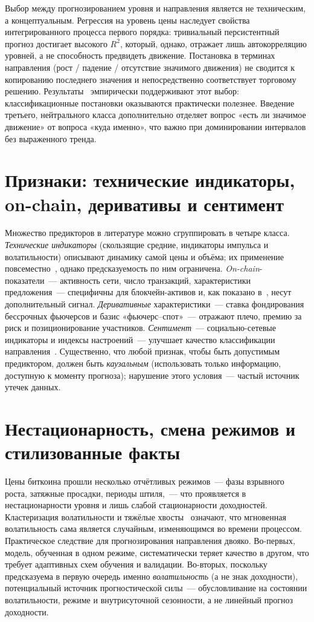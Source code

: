 \documentclass[12pt,a4paper]{report}
\begin{document}
Выбор между прогнозированием уровня и направления является не техническим, а
концептуальным. Регрессия на уровень цены наследует свойства интегрированного
процесса первого порядка: тривиальный персистентный прогноз достигает высокого
$R^2$, который, однако, отражает лишь автокорреляцию уровней, а не способность
предвидеть движение. Постановка в терминах направления (рост / падение / отсутствие
значимого движения) не сводится к копированию последнего значения и непосредственно
соответствует торговому решению. Результаты~\cite{ji2019, ortu2022} эмпирически
поддерживают этот выбор: классификационные постановки оказываются практически
полезнее. Введение третьего, нейтрального класса дополнительно отделяет вопрос
«есть ли значимое движение» от вопроса «куда именно», что важно при доминировании
интервалов без выраженного тренда.

\section{Признаки: технические индикаторы, on-chain, деривативы и сентимент}

Множество предикторов в литературе можно сгруппировать в четыре класса.
\emph{Технические индикаторы} (скользящие средние, индикаторы импульса и
волатильности) описывают динамику самой цены и объёма; их применение
повсеместно~\cite{ji2019, livieris2020, labbaf2024}, однако предсказуемость по
ним ограничена. \emph{On-chain}-показатели~--- активность сети, число транзакций,
характеристики предложения~--- специфичны для блокчейн-активов и, как показано
в~\cite{kim2022}, несут дополнительный сигнал. \emph{Деривативные}
характеристики~--- ставка фондирования бессрочных фьючерсов и базис
«фьючерс--спот»~--- отражают плечо, премию за риск и позиционирование участников.
\emph{Сентимент}~--- социально-сетевые индикаторы и индексы настроений~--- улучшает
качество классификации направления~\cite{ortu2022, dashtaki2025}. Существенно, что
любой признак, чтобы быть допустимым предиктором, должен быть \emph{каузальным}
(использовать только информацию, доступную к моменту прогноза); нарушение этого
условия~--- частый источник утечек данных.

\section{Нестационарность, смена режимов и стилизованные факты}

Цены биткоина прошли несколько отчётливых режимов~--- фазы взрывного роста,
затяжные просадки, периоды штиля,~--- что проявляется в нестационарности уровня и
лишь слабой стационарности доходностей. Кластеризация волатильности и тяжёлые
хвосты~\cite{mandelbrot1963} означают, что мгновенная волатильность сама является
случайным, изменяющимся во времени процессом. Практическое следствие для
прогнозирования направления двояко. Во-первых, модель, обученная в одном режиме,
систематически теряет качество в другом, что требует адаптивных схем обучения и
валидации. Во-вторых, поскольку предсказуема в первую очередь именно
\emph{волатильность} (а не знак доходности), потенциальный источник прогностической
силы~--- обусловливание на состоянии волатильности, режиме и внутрисуточной
сезонности, а не линейный прогноз доходности.
\end{document}
